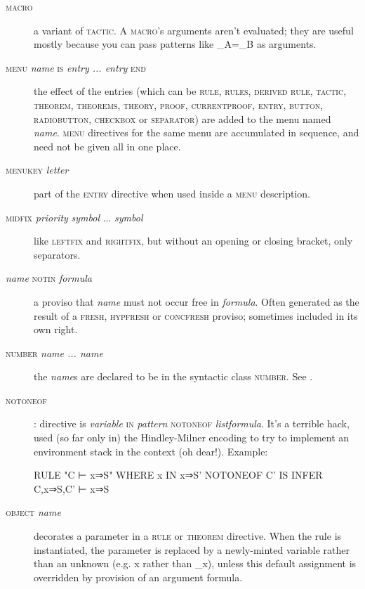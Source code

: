 \begin{description}
\item[\textsc{macro}] a variant of \textsc{tactic}. A \textsc{macro}'s arguments aren't evaluated; they are useful mostly because you can pass patterns like \_A=\_B as arguments.

\item[\textsc{menu} \textit{name} \textsc{is} \textit{entry ... entry} \textsc{end}] the effect of the entries (which can be \textsc{rule, rules, derived rule, tactic, theorem, theorems, theory, proof, currentproof, entry, button, radiobutton, checkbox} or \textsc{separator)} are added to the menu named \textit{name}. \textsc{menu} directives for the same menu are accumulated in sequence, and need not be given all in one place.

\item[\textsc{menukey} \textit{letter}] part of the \textsc{entry} directive when used inside a \textsc{menu} description.

\item[\textsc{midfix} \textit{priority} \textit{symbol} ... \textit{symbol}]\! like \textsc{leftfix} and \textsc{rightfix}, but without an opening or closing bracket, only separators.
 
\item[\textit{name} \textsc{notin} \textit{formula}] a proviso that \textit{name} must not occur free in \textit{formula}. Often generated as the result of a \textsc{fresh, hypfresh} or \textsc{concfresh} proviso; sometimes included in its own right.

\item[\textsc{number} \textit{name ... name}] the \textit{name}s are declared to be in the syntactic class \textsc{number}. See .

\item[\textsc{notoneof}]: directive is \textit{variable} \textsc{in} \textit{pattern} \textsc{notoneof} \textit{listformula}. It's a terrible hack, used (so far only in) the Hindley-Milner encoding to try to implement an environment stack in the context (oh dear!). Example:
\begin{japeish}
RULE "C ⊢ x⇒S" WHERE x IN x⇒S' NOTONEOF C' IS INFER C,x⇒S,C' ⊢ x⇒S
\end{japeish}

\item[\textsc{object} \textit{name}] decorates a parameter in a \textsc{rule} or \textsc{theorem} directive. When the rule is instantiated, the parameter is replaced by a newly-minted variable rather than an unknown (e.g. x rather than \_x), unless this default assignment is overridden by provision of an argument formula.


\end{description}
